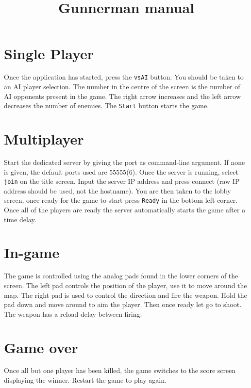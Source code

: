 \documentclass[11pt]{article} %
\title{Gunnerman manual}
\date{} %
\begin{document}
\maketitle

\section*{Single Player}

Once the application has started, press the \verb+vsAI+ button. You should be taken to an AI player selection. The number in the centre of the screen is the number of AI opponents present in the game. The right arrow increases and the left arrow decreases the number of enemies. The \verb+Start+ button starts the game.

\section*{Multiplayer}

Start the dedicated server by giving the port as command-line argument. If none is given, the default ports used are 55555(6). Once the server is running, select \verb+join+ on the title screen. Input the server IP address and press connect (raw IP address should be used, not the hostname). You are then taken to the lobby screen, once ready for the game to start press \verb+Ready+ in the bottom left corner. Once all of the players are ready the server automatically starts the game after a time delay.

\section*{In-game}

The game is controlled using the analog pads found in the lower corners of the screen. The left pad controls the position of the player, use it to move around the map. The right pad is used to control the direction and fire the weapon. Hold the pad down and move around to aim the player. Then once ready let go to shoot. The weapon has a reload delay between firing.

\section*{Game over}

Once all but one player has been killed, the game switches to the score screen displaying the winner. Restart the game to play again.
\end{document}

